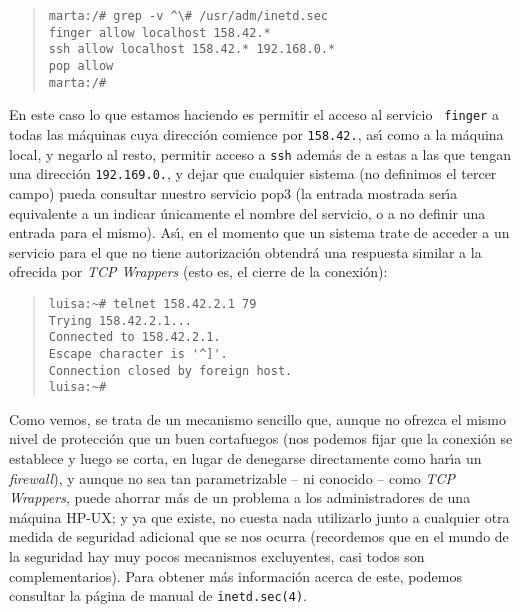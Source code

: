 \begin{quote}
\begin{verbatim}
marta:/# grep -v ^\# /usr/adm/inetd.sec
finger allow localhost 158.42.* 
ssh allow localhost 158.42.* 192.168.0.*
pop allow
marta:/#
\end{verbatim}
\end{quote}
En este caso lo que estamos haciendo es permitir el acceso al servicio {\tt 
finger} a todas las m\'aquinas cuya direcci\'on comience por {\tt 158.42.},
as\'{\i} como a la m\'aquina local, y
negarlo al resto, permitir acceso a {\tt ssh} adem\'as de a estas a las que 
tengan una direcci\'on {\tt 192.169.0.}, y dejar que cualquier sistema (no 
definimos el tercer campo) pueda consultar nuestro servicio {\sc pop3}
(la entrada mostrada ser\'{\i}a equivalente a un indicar \'unicamente el
nombre del servicio, o a no definir una entrada para el mismo). As\'{\i},
en el momento que un sistema trate de acceder a un servicio para el que no 
tiene autorizaci\'on obtendr\'a una respuesta similar a la ofrecida por {\it
TCP Wrappers} (esto es, el cierre de la conexi\'on):
\begin{quote}
\begin{verbatim}
luisa:~# telnet 158.42.2.1 79  
Trying 158.42.2.1...
Connected to 158.42.2.1.
Escape character is '^]'.
Connection closed by foreign host.
luisa:~#
\end{verbatim}
\end{quote}
Como vemos, se trata de un mecanismo sencillo que, aunque no ofrezca el mismo
nivel de protecci\'on que un buen cortafuegos (nos podemos fijar que la 
conexi\'on se establece y luego se corta, en lugar de denegarse directamente
como har\'{\i}a un {\it firewall}), y aunque no sea tan parametrizable -- ni
conocido -- como {\it TCP Wrappers}, puede ahorrar m\'as de un problema a los
administradores de una m\'aquina HP-UX; y ya que existe, no cuesta nada 
utilizarlo junto a cualquier otra medida de seguridad adicional que se nos
ocurra (recordemos que en el mundo de la seguridad hay muy pocos mecanismos 
excluyentes, casi todos son complementarios). Para obtener m\'as informaci\'on
acerca de este, podemos consultar la p\'agina de manual de {\tt inetd.sec(4)}.
